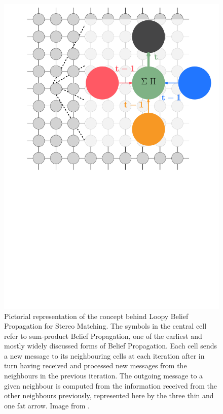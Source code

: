 \begin{figure}
    \centering
    \includegraphics[width=1.0\textwidth]{chapters/litreview/images/bp_diagram_recoloured.pdf}
    \caption[Pictorial representation of the concept behind \acrlong{lbp} for \gls{sm}]{Pictorial representation of the concept behind Loopy Belief Propagation for Stereo Matching. The symbols in the central cell refer to sum-product Belief Propagation, one of the earliest and mostly widely discussed forms of Belief Propagation. Each cell sends a new message to its neighbouring cells at each iteration after in turn having received and processed new messages from the neighbours in the previous iteration. The outgoing message to a given neighbour is computed from the information received from the other neighbours previously, represented here by the three thin and one fat arrow.  Image from \cite{lbpmpsmpic}.}
    \label{fig:bpdiagram}
\end{figure}

